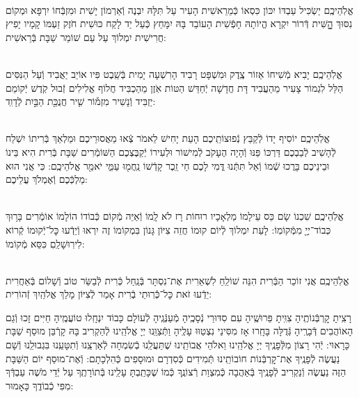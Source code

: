 \documentclass[twoside, openany, parskip=half, 11pt]{book}
\begin{document}
\begin{footnotesize}
\\
אֱלֹֽהֵיכֶֽם יַשְׂכִּיל עַבְדּוֹ יִכּוֹן כִּסְאוֹ כְּֿמֵרֵאשִׁית הָעִיר עַל תִּלָּהּ יִבְנֶה וְֿאַרְמוֹן יָשִׁית וּמִזְבְּֿחוֹ יִרְפָּא וּמְקוֹם נִסּוּךְ הׇׇׇׇׇׇָשִּׁית דְּֿרוֹר יִקְרָא הֱיוֹתָהּ חָפְֿשִׁית הָעוֹבֵד בָּהּ יִמָּחֵץ כְּֿעַל יַד לָקַח כּוּשִׁית חֹזֶק זַעְמּוֹ קָמָיו יָפִיץ חֲרִישִׁית יִמְלוֹךְ עַל עַם שׁוֹמֵר שַׁבָּת בְּֿרֵאשִׁית:

\\
אֱלֹֽהֵיכֶֽם יָבִיא מְֿשִׁיחוֹ אֵזוֹר צֶֽדֶק וּמִשְׁפָּט רָבִיד הָרִשְׁעָה יָמִית בְּֿשֵֽׁבֶט פִּיו אוֹיֵב יַאֲבִיד וְֿעַל הַנִּסִּים הַלֵּל לִגְמוֹר צָעִיר מֵהַעֲבִיד דָּת חֲדָשָׁה יְֿחַדֵּשׁ הַטּוֹת אֹֽזֶן מֵהַכְבִּיד חֲלוֹף אֱלִילִים זְֿבוּל קֹֽדֶשׁ יְֿקוֹמֵם יַזְבִּיד וְֿנָשִׁיר מִזְמ֡וֹר שִׁ֤יר חֲנֻכַּ֖ת הַבַּ֣יִת לְֿדָוִֽד:

\\
אֱלֹֽהֵיכֶֽם יוֹסִיף יָדוֹ לְֿקַבֵּץ נְֿפוּצוֹתֵֽיכֶם הָעֵת יָחִישׁ לֵאמֹר צְֿאוּ מֵאֲסוּרֵיכֶם וּמַלְאַךְ בְּֿרִיתוֹ יִשְׁלַח לְֿהָשִׁיב לְֿבַבְכֶם דַּרְכּוֹ פַּנּוּ וְֿהָיָה הֶעָקֹב לְֿמִישׁוֹר וּלְעִירוֹ יְֿקַבֶּצְכֶם הַשּׁוֹמְֿרִים שַׁבָּת בְּֿרִית הִיא בֵּינוֹ וּבֵינֵיכֶם בָּרֲכוּ שְֿׁמוֹ וְֿאַל תִּתְּֿנוּ דֳּמִי לָכֶם חַי זֵֽכֶר קָדְֿשׁוֹ נַֽחֲמ֖וּ עַמִּ֑י יֹאמַ֖ר אֱלֹהֵיכֶֽם: כִּי אֲנִי הוּא מַלְכְּֿכֶם וְֿאֶמְלֹךְ עֲלֵיכֶם:


\\
אֱלֹֽהֵיכֶֽם שִׁכְנוֹ שָׂם כֵּס עֵילָמוֹ מַלְאָכָיו רוּחוֹת רָז לֹא לָֽמוֹ וְֿאַיֵּה מְֿקוֹם כְּֿבוֹדוֹ הוֹלָמוֹ אוֹמְֿרִים בָּר֥וּךְ כְּבוֹד־יְיָ֖ מִמְּֿקוֹמֽוֹ: לָעֵת יִמְלוֹךְ לְֿיוֹם קוּמוֹ חֲזֵה צִיּוֹן גָּנוֹן בִּמְקוֹמוֹ זֶה יִרְאוּ וְֿיֵדְֿעוּ כׇּל־יְֿקוּמוֹ קְֿרוֹא לִירֽוּשָׁלַֽםִ כִּסֵּא מְֿקוֹמוֹ:

\\
אֱלֹֽהֵיכֶֽם אֲנִי זוֹכֵר הַבְּֿרִית הִנֵּה שׁוֹלֵֽחַ לִשְׁאֵרִית אֶת־נִסְתָּר בְּֿנַֽחַל כְּֿרִית לְֿבַשֵּׂר טוֹב וְֿשָׁלוֹם בְּֿאַחֲרִית יֵדְֿעוּ זֹאת כׇּל־כְּֿֿרֽוּתֵי בְֿרִית אָמַר לְֿצִיּוֹן מָלַךְ אֱלֹהַֽיִךְ זְֿהוֹרִית:

\end{footnotesize}



\sepline

\shabboskiddushhashem


 רָצִֽיתָ קׇרְבְּֿנוֹתֶֽיהָ צִוִּֽיתָ פֵּרוּשֶֽׁיהָ עִם סִדּוּרֵי נְֿסָכֶֽיהָ מְֿעַנְּֿגֶֽיהָ לְֿעוֹלָם כָּבוֹד יִנְחָֽלוּ טוֹעֲמֶֽיהָ חַיִּים זָכוּ וְֿגַם הָאוֹהֲבִים דְּֿבָרֶֽיהָ גְּֿדֻלָּה בָּחָֽרוּ אָז מִסִּינַי נִצְטַוּוּ עָלֶֽיהָ
וַתְּֿצַוֵּֽנוּ יְיָ אֱלֹהֵֽינוּ לְֿהַקְרִיב בָּהּ קָרְֿבַּן מוּסַף שַׁבָּת כָּרָאוּי: יְֿהִי רָצוֹן מִלְּֿפָנֶֽיךָ יְיָ אֱלֹהֵֽינוּ וֵאלֹהֵי אֲבוֹתֵֽינוּ שֶׁתַּעֲלֵֽנוּ בְֿשִׂמְחָה לְֿאַרְצֵֽנוּ וְֿתִטָּעֵֽנוּ בִּגְבוּלֵֽנוּ וְֿשָׁם נַעֲשֶׂה לְֿפָנֶֽיךָ אֶת־קׇרְבְּֿנוֹת חוֹבוֹתֵֽינוּ תְּֿמִידִים כְּֿסִדְרָם וּמוּסָפִים כְּֿהִלְכָתָם: וְֿאֶת־מוּסַף יוֹם הַשַּׁבָּת הַזֶּה נַעֲשֶׂה וְֿנַקְרִיב לְֿפָנֶֽיךָ בְּֿאַהֲבָה כְּֿמִצְוַת רְֿצוֹנֶֽךָ כְּֿמוֹ שֶׁכָּתַֽבְתָּ עָלֵֽינוּ בְּֿתוֹרָתֶֽךָ עַל יְֿדֵי מֹשֶׁה עַבְדְּֿךָ מִפִּי כְֿבוֹדֶֽךָ כָּאָמוּר:
\end{document}
